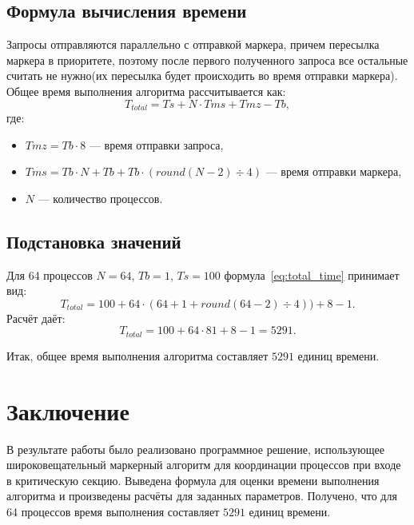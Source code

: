 \documentclass[openany, twoside, a4paper, 12pt]{extbook}
\begin{document}
\subsection*{Формула вычисления времени}
Запросы отправляются параллельно с отправкой маркера, причем пересылка маркера в приоритете, поэтому
после первого полученного запроса все остальные считать не нужно(их пересылка будет происходить во время отправки маркера).
Общее время выполнения алгоритма рассчитывается как:
\begin{equation}
    \label{eq:total_time}
    T_{total} = Ts + N \cdot Tms + Tmz - Tb,
\end{equation}
где:
\begin{itemize}
    \item $Tmz = Tb \cdot 8$ — время отправки запроса,
	\item $Tms = Tb \cdot N + Tb  + Tb \cdot (round(N-2) \div 4)$ — время отправки маркера,
    \item $N$ — количество процессов.
\end{itemize}



\subsection*{Подстановка значений}
Для 64 процессов $N = 64$, $Tb = 1$, $Ts = 100$ формула~\ref{eq:total_time} принимает вид:
\[
	T_{total} = 100 + 64 \cdot (64 + 1 + round(64 - 2) \div 4) ) + 8 - 1.
\]
Расчёт даёт:
\[
T_{total} = 100 + 64 \cdot 81 + 8 - 1 = 5291.
\]

Итак, общее время выполнения алгоритма составляет $5291$ единиц времени.

\section*{Заключение}
В результате работы было реализовано программное решение,
использующее широковещательный маркерный алгоритм для координации процессов
при входе в критическую секцию. Выведена формула для оценки времени выполнения алгоритма и 
произведены расчёты для заданных параметров.
Получено, что для 64 процессов время выполнения составляет $5291$ единиц времени.
\end{document}
